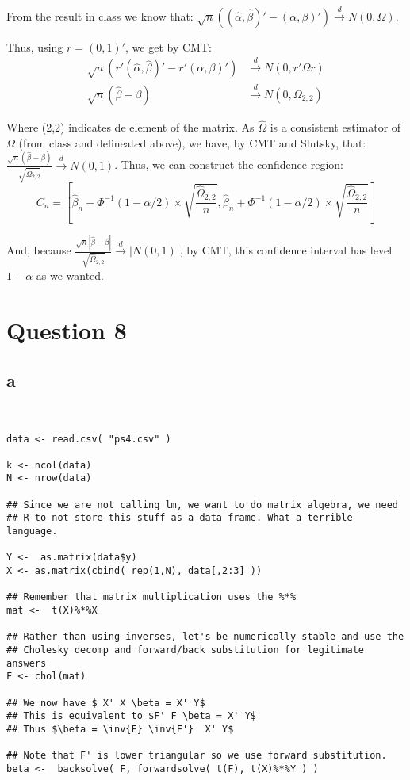 \documentclass[12pt]{paper}
\begin{document}
From the result in class we know that:
$\sqrt{n}((\hat{\alpha},\hat{\beta})'-(\alpha,\beta)')\overset{d}{\to}N(0,\Omega)$.

Thus, using $r=(0,1)'$, we get by CMT:
\begin{equation}
\begin{split}
\sqrt{n}(r'(\hat{\alpha},\hat{\beta})'-r'(\alpha,\beta)')&\overset{d}{\to}N(0,r'\Omega r)\\
\sqrt{n}(\hat{\beta}-\beta)&\overset{d}{\to}N(0,\Omega_{2,2})
\end{split}
\end{equation}

Where (2,2) indicates de element of the matrix. As $\hat \Omega$ is a consistent estimator of $\Omega$ (from class and delineated above), we have, by CMT and Slutsky, that: $\frac{\sqrt{n}(\hat{\beta}-\beta)}{\sqrt{\hat{\Omega}_{2,2}}}\overset{d}{\to}N(0,1)$. Thus, we can construct the confidence region:
$$C_n = [\hat \beta_n - \Phi^{-1}({1-\alpha/2})\times \sqrt{\frac{\hat \Omega_{2,2}}{n}}, \hat \beta_n +  \Phi^{-1}({1-\alpha/2})\times \sqrt{\frac{\hat \Omega_{2,2}}{n}}]  $$

And, because $\frac{\sqrt{n}|\hat{\beta}-\beta|}{\sqrt{\hat{\Omega}_{2,2}}}\overset{d}{\to}|N(0,1)|$, by CMT, this confidence interval has level $1-\alpha$ as we wanted.



\section*{Question 8}

\subsection*{a}

\begin{verbatim}


data <- read.csv( "ps4.csv" )

k <- ncol(data)
N <- nrow(data)

## Since we are not calling lm, we want to do matrix algebra, we need
## R to not store this stuff as a data frame. What a terrible language.

Y <-  as.matrix(data$y)
X <- as.matrix(cbind( rep(1,N), data[,2:3] ))

## Remember that matrix multiplication uses the %*%
mat <-  t(X)%*%X

## Rather than using inverses, let's be numerically stable and use the
## Cholesky decomp and forward/back substitution for legitimate answers
F <- chol(mat)

## We now have $ X' X \beta = X' Y$
## This is equivalent to $F' F \beta = X' Y$
## Thus $\beta = \inv{F} \inv{F'}  X' Y$

## Note that F' is lower triangular so we use forward substitution.
beta <-  backsolve( F, forwardsolve( t(F), t(X)%*%Y ) )

\end{verbatim}
\end{document}
